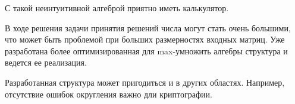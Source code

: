 \documentclass[specialist, substylefile = spbureport.rtx,
    subf,href,colorlinks=true, 12pt]{disser}
\begin{document}
    \conclusion

    С такой неинтуитивной алгеброй приятно иметь калькулятор.
    
    В ходе решения задачи принятия решений числа могут стать очень большими, что может быть проблемой при больших размерностях входных матриц. Уже разработана более оптимизированная для max-умножить алгебры структура и ведется ее реализация.

    Разработанная структура может пригодиться и в других областях. Например, отсутствие ошибок округления важно дли криптографии.
    




    \renewcommand{\refname}{}
    \vspace{-25pt}
    
    
\end{document}

